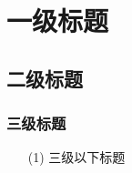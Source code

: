 
\section{一级标题}
\subsection{二级标题}
\subsubsection{三级标题}

\begin{itemize}
        \item [(1)] 三级以下标题
\end{itemize}
